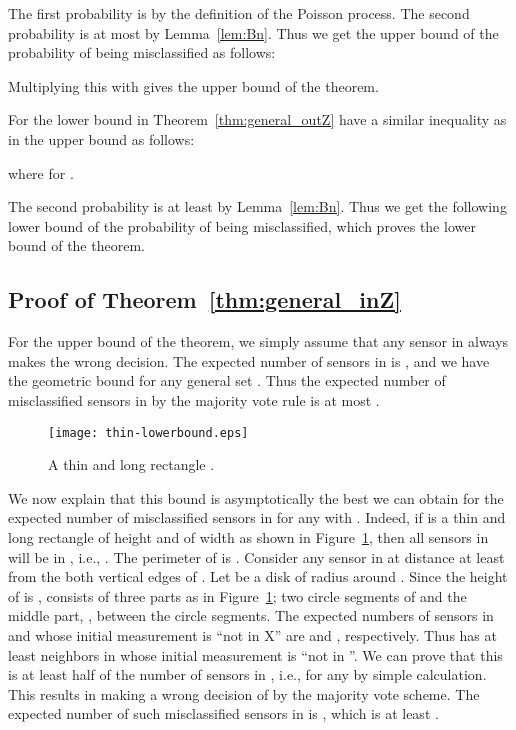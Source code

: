 \documentclass{article}
\begin{document}
The first probability is  by the definition of the Poisson process. The second probability  is at most  by Lemma~\ref{lem:Bn}. Thus we get the upper bound of the probability of  being misclassified as follows:

Multiplying this with  gives the upper bound of the theorem.

\par
For the lower bound in Theorem~\ref{thm:general_outZ} have a similar inequality as in the upper bound as follows:

where  for .

The second probability is at least  by Lemma~\ref{lem:Bn}. Thus we get the following lower bound of the probability of  being misclassified, which proves the lower bound of the theorem.



\subsection{Proof of Theorem~\ref{thm:general_inZ}}
For the upper bound of the theorem, we simply assume that any sensor in  always makes the wrong decision. The expected number of sensors in  is , and we have the geometric bound  for any general set . Thus the expected number of misclassified sensors in  by the majority vote rule is at most .

\begin{figure}
\centering
    \texttt{[image: thin-lowerbound.eps]}
\caption{A thin and long rectangle .}
\label{fig:thin-lowerbound}
\end{figure}

\par
We now explain that this bound is asymptotically the best we can obtain for the expected number of misclassified sensors in  for any  with . Indeed, if  is a thin and long rectangle of height  and of width  as shown in Figure~\ref{fig:thin-lowerbound}, then all sensors in  will be in , i.e., . The perimeter of  is . Consider any sensor  in  at distance at least  from the both vertical edges of . Let  be a disk of radius  around . Since the height of  is ,  consists of three parts as in Figure~\ref{fig:thin-lowerbound}; two circle segments of  and the middle part, , between the circle segments. The expected numbers of sensors in  and  whose initial measurement is ``not in X'' are  and , respectively. Thus  has at least  neighbors in  whose initial measurement is ``not in ''. We can prove that this is at least half of the number of sensors in , i.e.,  for any  by simple calculation. This results in making a wrong decision of  by the majority vote scheme. The expected number of such misclassified sensors in  is , which is at least .
\end{document}
